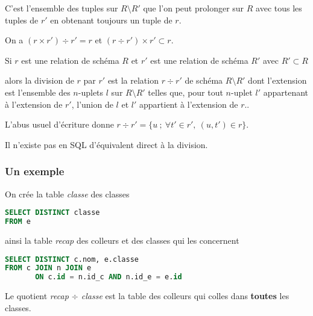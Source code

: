C'est l'ensemble des tuples sur $R\setminus R'$ que l'on peut prolonger sur $R$ avec tous les tuples de $r'$ en obtenant toujours un tuple de $r$.

On a $(r \times r')\div r'=r$ et $(r \div r')\times r' \subset r$.
\begin{defin}

Si $r$ est une relation de schéma $R$ et $r'$ est une relation de schéma $R'$ avec $R'\subset R$ 

alors la division de $r$ par $r'$ est la relation $r \div r'$ de schéma $R\setminus R'$ dont l'extension est l'ensemble des $n$-uplets $l$ sur $R\setminus R'$ telles que, pour tout $n$-uplet $l'$ appartenant à l'extension de $r'$, l'union de $l$ et $l'$ appartient à l'extension de $r$..

L'abus usuel d'écriture donne
$r\div r'=\bigl\{u\ ;\ \forall t'\in r',\ (u,t')\in r\bigr\}$.
\end{defin}
Il n'existe pas en SQL d'équivalent direct à la division.
\subsubsection{Un exemple}
On crée la table {\it classe} des classes
\begin{lstlisting}[language=SQL]
SELECT DISTINCT classe
FROM e
\end{lstlisting}
ainsi la table {\it recap} des colleurs et des classes qui les concernent
\begin{lstlisting}[language=SQL]
SELECT DISTINCT c.nom, e.classe
FROM c JOIN n JOIN e 
       ON c.id = n.id_c AND n.id_e = e.id
\end{lstlisting}
Le quotient {\it recap $\div$ classe} est la table des colleurs qui colles dans {\bf toutes} les classes.

